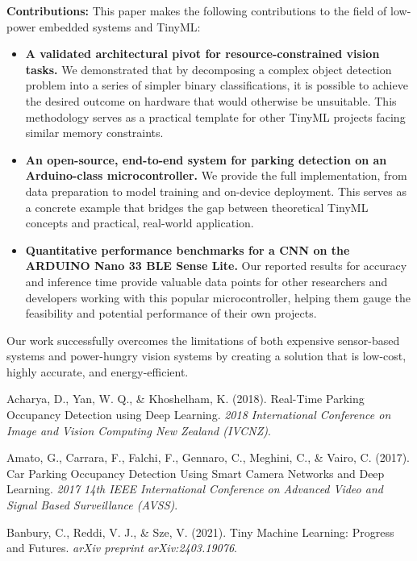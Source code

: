 \documentclass[sigconf,10pt,nonacm]{acmart}
\begin{document}
\noindent\textbf{Contributions:}
This paper makes the following contributions to the field of low-power embedded systems and TinyML:
\begin{itemize}
    \item \textbf{A validated architectural pivot for resource-constrained vision tasks.} We demonstrated that by decomposing a complex object detection problem into a series of simpler binary classifications, it is possible to achieve the desired outcome on hardware that would otherwise be unsuitable. This methodology serves as a practical template for other TinyML projects facing similar memory constraints.
    
    \item \textbf{An open-source, end-to-end system for parking detection on an Arduino-class microcontroller.} We provide the full implementation, from data preparation to model training and on-device deployment. This serves as a concrete example that bridges the gap between theoretical TinyML concepts and practical, real-world application.
    
    \item \textbf{Quantitative performance benchmarks for a CNN on the ARDUINO Nano 33 BLE Sense Lite.} Our reported results for accuracy and inference time provide valuable data points for other researchers and developers working with this popular microcontroller, helping them gauge the feasibility and potential performance of their own projects.
\end{itemize}

Our work successfully overcomes the limitations of both expensive sensor-based systems and power-hungry vision systems by creating a solution that is low-cost, highly accurate, and energy-efficient.

\begin{thebibliography}{9}

Acharya, D., Yan, W. Q., \& Khoshelham, K. (2018).
Real-Time Parking Occupancy Detection using Deep Learning.
\textit{2018 International Conference on Image and Vision Computing New Zealand (IVCNZ)}.

Amato, G., Carrara, F., Falchi, F., Gennaro, C., Meghini, C., \& Vairo, C. (2017).
Car Parking Occupancy Detection Using Smart Camera Networks and Deep Learning.
\textit{2017 14th IEEE International Conference on Advanced Video and Signal Based Surveillance (AVSS)}.

Banbury, C., Reddi, V. J., \& Sze, V. (2021).
Tiny Machine Learning: Progress and Futures.
\textit{arXiv preprint arXiv:2403.19076}.

\end{thebibliography}
\end{document}
